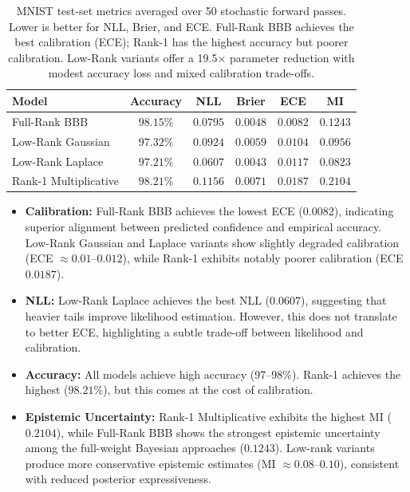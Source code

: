 \documentclass{article}
\theoremstyle{plain}
\theoremstyle{definition}
\theoremstyle{remark}
\begin{document}
\begin{table}[h]
\centering
\small
\begin{tabular}{l c c c c c}
\toprule
\textbf{Model} & \textbf{Accuracy} & \textbf{NLL} & \textbf{Brier} & \textbf{ECE} & \textbf{MI} \\
\midrule
Full-Rank BBB & $98.15\%$ & $0.0795$ & $0.0048$ & $0.0082$ & $0.1243$ \\
Low-Rank Gaussian & $97.32\%$ & $0.0924$ & $0.0059$ & $0.0104$ & $0.0956$ \\
Low-Rank Laplace & $97.21\%$ & $0.0607$ & $0.0043$ & $0.0117$ & $0.0823$ \\
Rank-1 Multiplicative & $98.21\%$ & $0.1156$ & $0.0071$ & $0.0187$ & $0.2104$ \\
\bottomrule
\end{tabular}
\caption{MNIST test-set metrics averaged over 50 stochastic forward passes. Lower is better for NLL, Brier, and ECE. Full-Rank BBB achieves the best calibration (ECE); Rank-1 has the highest accuracy but poorer calibration. Low-Rank variants offer a 19.5$\times$ parameter reduction with modest accuracy loss and mixed calibration trade-offs.}
\label{tab:results_mnist}
\end{table}

\begin{itemize}
    \item \textbf{Calibration:} Full-Rank BBB achieves the lowest ECE ($0.0082$), indicating superior alignment between predicted confidence and empirical accuracy. Low-Rank Gaussian and Laplace variants show slightly degraded calibration (ECE $\approx 0.01$–$0.012$), while Rank-1 exhibits notably poorer calibration (ECE $0.0187$).
    \item \textbf{NLL:} Low-Rank Laplace achieves the best NLL ($0.0607$), suggesting that heavier tails improve likelihood estimation. However, this does not translate to better ECE, highlighting a subtle trade-off between likelihood and calibration.
    \item \textbf{Accuracy:} All models achieve high accuracy (97–98\%). Rank-1 achieves the highest ($98.21\%$), but this comes at the cost of calibration.
\item \textbf{Epistemic Uncertainty:} Rank-1 Multiplicative exhibits the highest MI ($0.2104$), while Full-Rank BBB shows the strongest epistemic uncertainty among the full-weight Bayesian approaches ($0.1243$). Low-rank variants produce more conservative epistemic estimates (MI $\approx 0.08$--$0.10$), consistent with reduced posterior expressiveness.

\end{itemize}
\end{document}
